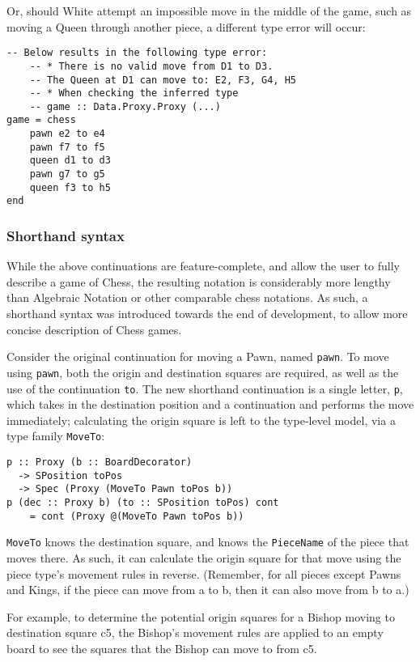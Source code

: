 \documentclass[12pt, a4paper, bibliography=totocnumbered]{scrreprt}
\newcommand{\inline}[1]{\lstinline[basicstyle=\ttfamily\footnotesize]{#1}}
\begin{document}
Or, should White attempt an impossible move in the middle of the game, such as moving a Queen through another piece, a different type error will occur:

\begin{lstlisting}
-- Below results in the following type error:
    -- * There is no valid move from D1 to D3.
    -- The Queen at D1 can move to: E2, F3, G4, H5
    -- * When checking the inferred type
    -- game :: Data.Proxy.Proxy (...)
game = chess
    pawn e2 to e4
    pawn f7 to f5
    queen d1 to d3
    pawn g7 to g5
    queen f3 to h5
end
\end{lstlisting}

\subsubsection{Shorthand syntax}

While the above continuations are feature-complete, and allow the user to fully describe a game of Chess, the resulting notation is considerably more lengthy than Algebraic Notation or other comparable chess notations. As such, a shorthand syntax was introduced towards the end of development, to allow more concise description of Chess games.

Consider the original continuation for moving a Pawn, named \inline{pawn}. To move using \inline{pawn}, both the origin and destination squares are required, as well as the use of the continuation \inline{to}. The new shorthand continuation is a single letter, \inline{p}, which takes in the destination position and a continuation and performs the move immediately; calculating the origin square is left to the type-level model, via a type family \inline{MoveTo}:

\begin{lstlisting}
p :: Proxy (b :: BoardDecorator)
  -> SPosition toPos
  -> Spec (Proxy (MoveTo Pawn toPos b))
p (dec :: Proxy b) (to :: SPosition toPos) cont
    = cont (Proxy @(MoveTo Pawn toPos b))
\end{lstlisting}

\inline{MoveTo} knows the destination square, and knows the \inline{PieceName} of the piece that moves there. As such, it can calculate the origin square for that move using the piece type's movement rules in reverse. (Remember, for all pieces except Pawns and Kings, if the piece can move from a to b, then it can also move from b to a.)

For example, to determine the potential origin squares for a Bishop moving to destination square c5, the Bishop's movement rules are applied to an empty board to see the squares that the Bishop can move to from c5.
\end{document}
